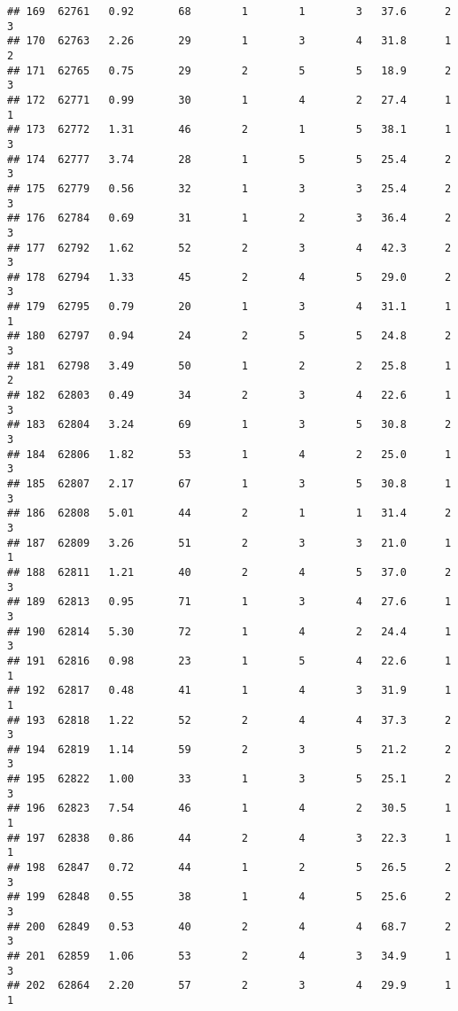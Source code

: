 \documentclass[
]{article}
\begin{document}
\begin{verbatim}
## 169  62761   0.92       68        1        1        3   37.6      2      3
## 170  62763   2.26       29        1        3        4   31.8      1      2
## 171  62765   0.75       29        2        5        5   18.9      2      3
## 172  62771   0.99       30        1        4        2   27.4      1      1
## 173  62772   1.31       46        2        1        5   38.1      1      3
## 174  62777   3.74       28        1        5        5   25.4      2      3
## 175  62779   0.56       32        1        3        3   25.4      2      3
## 176  62784   0.69       31        1        2        3   36.4      2      3
## 177  62792   1.62       52        2        3        4   42.3      2      3
## 178  62794   1.33       45        2        4        5   29.0      2      3
## 179  62795   0.79       20        1        3        4   31.1      1      1
## 180  62797   0.94       24        2        5        5   24.8      2      3
## 181  62798   3.49       50        1        2        2   25.8      1      2
## 182  62803   0.49       34        2        3        4   22.6      1      3
## 183  62804   3.24       69        1        3        5   30.8      2      3
## 184  62806   1.82       53        1        4        2   25.0      1      3
## 185  62807   2.17       67        1        3        5   30.8      1      3
## 186  62808   5.01       44        2        1        1   31.4      2      3
## 187  62809   3.26       51        2        3        3   21.0      1      1
## 188  62811   1.21       40        2        4        5   37.0      2      3
## 189  62813   0.95       71        1        3        4   27.6      1      3
## 190  62814   5.30       72        1        4        2   24.4      1      3
## 191  62816   0.98       23        1        5        4   22.6      1      1
## 192  62817   0.48       41        1        4        3   31.9      1      1
## 193  62818   1.22       52        2        4        4   37.3      2      3
## 194  62819   1.14       59        2        3        5   21.2      2      3
## 195  62822   1.00       33        1        3        5   25.1      2      3
## 196  62823   7.54       46        1        4        2   30.5      1      1
## 197  62838   0.86       44        2        4        3   22.3      1      1
## 198  62847   0.72       44        1        2        5   26.5      2      3
## 199  62848   0.55       38        1        4        5   25.6      2      3
## 200  62849   0.53       40        2        4        4   68.7      2      3
## 201  62859   1.06       53        2        4        3   34.9      1      3
## 202  62864   2.20       57        2        3        4   29.9      1      1

\end{verbatim}
\end{document}
